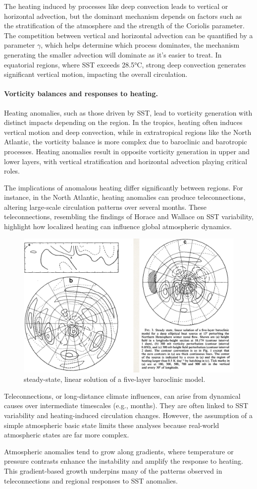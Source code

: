 The heating induced by processes like deep convection leads to vertical or horizontal advection, but the dominant mechanism depends on factors such as the stratification of the atmosphere and the strength of the Coriolis parameter. The competition between vertical and horizontal advection can be quantified by a parameter $\gamma$, which helps determine which process dominates, the mechanism generating the smaller advection will dominate as it's easier to treat. In equatorial regions, where SST exceeds 28.5°C, strong deep convection generates significant vertical motion, impacting the overall circulation.

\paragraph{Vorticity balances and responses to heating.}
Heating anomalies, such as those driven by SST, lead to vorticity generation with distinct impacts depending on the region. In the tropics, heating often induces vertical motion and deep convection, while in extratropical regions like the North Atlantic, the vorticity balance is more complex due to baroclinic and barotropic processes. Heating anomalies result in opposite vorticity generation in upper and lower layers, with vertical stratification and horizontal advection playing critical roles.

The implications of anomalous heating differ significantly between regions. For instance, in the North Atlantic, heating anomalies can produce teleconnections, altering large-scale circulation patterns over several months. These teleconnections, resembling the findings of Horace and Wallace on SST variability, highlight how localized heating can influence global atmospheric dynamics.
\begin{figure}[htp!]
	\centering
	\includegraphics[width=0.4\linewidth]{uploads/Screenshot 2024-11-26 104358.png}
	\caption{steady-state, linear solution of a five-layer baroclinic model.}
	\label{fig:enter-label}
\end{figure}

Teleconnections, or long-distance climate influences, can arise from dynamical causes over intermediate timescales (e.g., months). They are often linked to SST variability and heating-induced circulation changes. However, the assumption of a simple atmospheric basic state limits these analyses because real-world atmospheric states are far more complex.

Atmospheric anomalies tend to grow along gradients, where temperature or pressure contrasts enhance the instability and amplify the response to heating. This gradient-based growth underpins many of the patterns observed in teleconnections and regional responses to SST anomalies.

